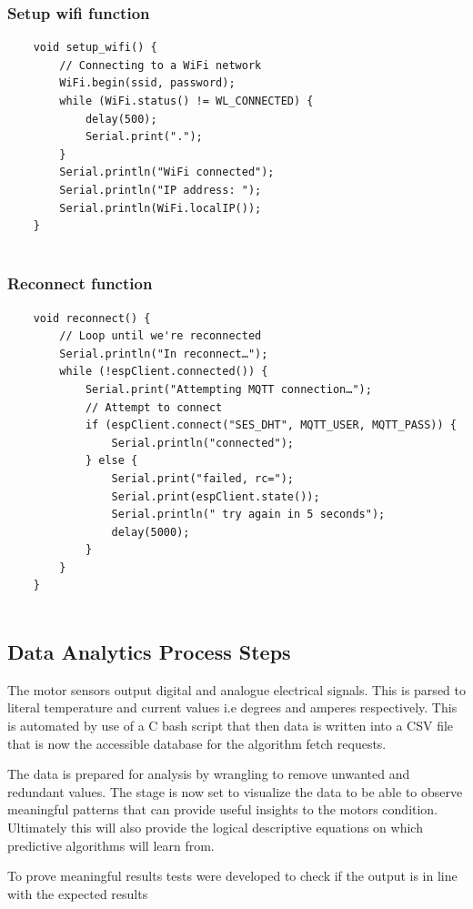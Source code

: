 \subsubsection{Setup wifi function}

\begin{lstlisting}
	void setup_wifi() {
		// Connecting to a WiFi network
		WiFi.begin(ssid, password);
		while (WiFi.status() != WL_CONNECTED) {
			delay(500);
			Serial.print(".");
		}
		Serial.println("WiFi connected");
		Serial.println("IP address: ");
		Serial.println(WiFi.localIP());
	}
	
\end{lstlisting}
\subsubsection{Reconnect function}

\begin{lstlisting}
	void reconnect() {
		// Loop until we're reconnected
		Serial.println("In reconnect…");
		while (!espClient.connected()) {
			Serial.print("Attempting MQTT connection…");
			// Attempt to connect
			if (espClient.connect("SES_DHT", MQTT_USER, MQTT_PASS)) {
				Serial.println("connected");
			} else {
				Serial.print("failed, rc=");
				Serial.print(espClient.state());
				Serial.println(" try again in 5 seconds");
				delay(5000);
			}
		}
	}
	
\end{lstlisting}

\subsection{Data Analytics Process Steps}
 
The motor sensors output digital and analogue electrical signals. This is parsed to literal temperature and current values i.e degrees and amperes respectively. 
This is automated by use of a C bash script that then data is written into a CSV file that is now the accessible database for the algorithm fetch requests. 

The data is prepared for analysis by wrangling to remove unwanted and redundant values. The stage is now set to visualize the data to be able to observe meaningful patterns that can provide useful insights to the motors condition. Ultimately this will also provide the logical descriptive equations on which predictive algorithms will learn from.

To prove meaningful results tests were developed to check if the output is in line with the expected results


